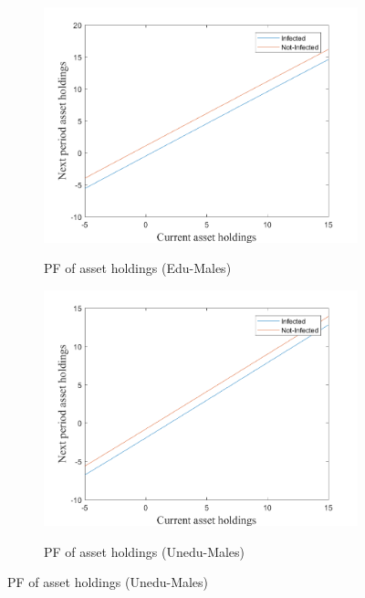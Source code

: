 \newpage
\begin{figure}\caption{Miopic onset of the epidemic, continuation:}
\begin{subfigure}{0.5\textwidth}\caption{PF of asset holdings (Edu-Males)}
   \includegraphics[width=\linewidth,height = 0.225\textheight]{figures/mio/FIG1.png}
    \label{fig_dert}
\end{subfigure}
\hspace*{\fill}
\begin{subfigure}{0.5\textwidth}\caption{PF of asset holdings (Unedu-Males)}
   \includegraphics[width=\linewidth,height = 0.225\textheight]{figures/mio/FIG2.png}
    \label{fig:x_b}
\end{subfigure}

\end{figure}
